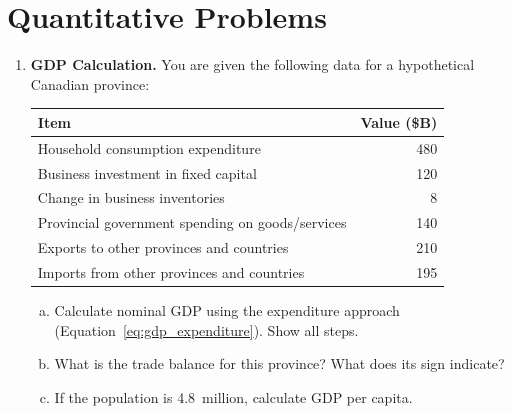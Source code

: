 \section*{Quantitative Problems}

\begin{enumerate}

\item \textbf{GDP Calculation.} You are given the following data for a
hypothetical Canadian province:
\begin{center}
\begin{tabular}{lr}
\toprule
Item & Value (\$B) \\
\midrule
Household consumption expenditure & 480 \\
Business investment in fixed capital & 120 \\
Change in business inventories & 8 \\
Provincial government spending on goods/services & 140 \\
Exports to other provinces and countries & 210 \\
Imports from other provinces and countries & 195 \\
\bottomrule
\end{tabular}
\end{center}
\begin{enumerate}[(a)]
  \item Calculate nominal GDP using the expenditure approach
        (Equation~\ref{eq:gdp_expenditure}). Show all steps.
  \item What is the trade balance for this province?
        What does its sign indicate?
  \item If the population is 4.8~million, calculate GDP per capita.
\end{enumerate}


\end{enumerate}
